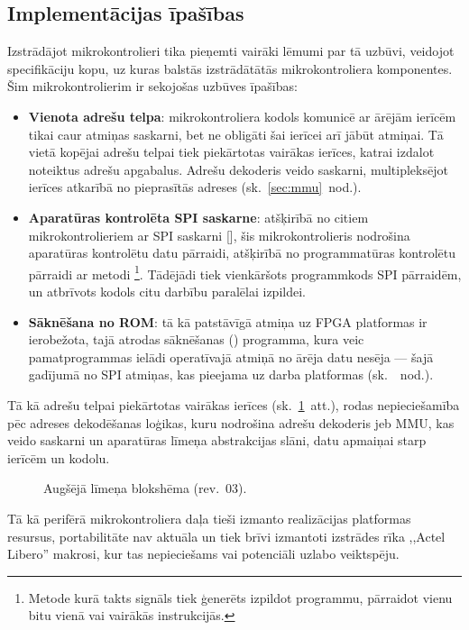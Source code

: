 \subsection{Implementācijas īpašības} \label{sec:design}
Izstrādājot mikrokontrolieri tika pieņemti vairāki lēmumi par tā uzbūvi,
veidojot specifikāciju kopu, uz kuras
balstās izstrādātātās mikrokontroliera komponentes.
Šim mikrokontrolierim ir sekojošas uzbūves īpašības:
\begin{itemize}
	\item \textbf{Vienota adrešu telpa}:
		mikrokontroliera kodols komunicē ar ārējām ierīcēm tikai caur
		atmiņas saskarni, bet ne obligāti šai ierīcei arī jābūt atmiņai.
		Tā vietā kopējai adrešu telpai tiek piekārtotas vairākas ierīces,
		katrai izdalot noteiktus adrešu apgabalus. Adrešu dekoderis veido saskarni,
		multipleksējot ierīces atkarībā no pieprasītās adreses
		(sk.~\ref{sec:mmu}~nod.).\pagebreak[1]
	\item \textbf{Aparatūras kontrolēta SPI saskarne}:
		atšķirībā no citiem mikrokontrolieriem ar SPI saskarni
		[\todo ], %
		šis mikro\-kontrolieris nodrošina aparatūras kontrolētu datu pārraidi,
		atšķirībā no programmatūras kontrolētu pārraidi ar
		 metodi%
		\footnote{Metode kurā takts signāls tiek ģenerēts izpildot programmu,
			pārraidot vienu bitu vienā vai vairākās instrukcijās.}.
		Tādējādi tiek vienkāršots programmkods SPI pārraidēm, un atbrīvots
		kodols citu darbību paralēlai izpildei.
	\item \textbf{Sāknēšana no ROM}:
		tā kā patstāvīgā atmiņa uz FPGA platformas ir ierobežota, tajā
		atrodas sāknēšanas () programma,
		kura veic pamatprogrammas ielādi
		operatīvajā atmiņā no ārēja datu nesēja --- šajā gadījumā no 
		SPI  atmiņas, kas pieejama uz darba platformas
		(sk.~\todo{}~nod.).
\end{itemize}

Tā kā adrešu telpai piekārtotas vairākas ierīces (sk.~\ref{fig:top-rev3}~att.),
rodas nepieciešamība pēc adreses dekodēšanas loģikas, kuru nodrošina
adrešu dekoderis jeb MMU, kas veido saskarni un 
aparatūras līmeņa abstrakcijas slāni, datu apmaiņai starp ierīcēm un kodolu.

\begin{figure}[tbhp]
	\centering
	\def\svgwidth{\textwidth}
	{}
	\caption{Augšējā līmeņa blokshēma (rev.~03).}
	\label{fig:top-rev3}
\end{figure}

Tā kā perifērā mikrokontroliera daļa tieši izmanto realizācijas
platformas resursus, portabilitāte nav aktuāla un tiek brīvi izmantoti izstrādes rīka 
,,Actel Libero'' makrosi, kur tas nepieciešams vai potenciāli uzlabo
veiktspēju.
\FloatBarrier %
